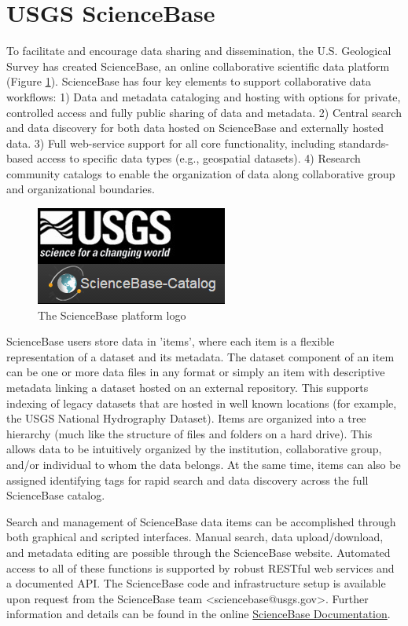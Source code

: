 \section{USGS ScienceBase}

To facilitate and encourage data sharing and dissemination,
the U.S. Geological Survey has created ScienceBase, an online
collaborative scientific data platform (Figure \ref{figure:sbfig}). 
ScienceBase has four key elements to support collaborative
data workflows: 1) Data and metadata
cataloging and hosting with options for private, controlled access
and fully public sharing of data and metadata. 2) Central search and
data discovery for both data hosted on ScienceBase and externally hosted 
data. 3) Full web-service support for all core functionality, including
standards-based access to specific data types (e.g., geospatial
datasets). 4) Research community catalogs to
enable the organization of data along collaborative group and
organizational boundaries.

 \begin{figure}[htbp]
   \centering
   \includegraphics{sblogo}
   \caption{The ScienceBase platform logo}
   \label{figure:sbfig}
 \end{figure}

ScienceBase users store data in 'items', where each item is a flexible
representation of a dataset and its metadata. The dataset component of an
item can be one or more data files in any format or simply an item with descriptive
metadata linking a dataset hosted on an external repository. This supports
indexing of legacy datasets that are hosted in well known locations (for example, 
the USGS National Hydrography Dataset). Items are organized into a tree hierarchy 
(much like the structure of files and
folders on a hard drive). This allows data to be intuitively organized by the
institution, collaborative group, and/or individual to whom
the data belongs. At the same time, items can also be assigned identifying tags
for rapid search and data discovery across the full ScienceBase catalog.

Search and management of ScienceBase data items can be accomplished through
both graphical and scripted interfaces. Manual search, data upload/download, and
metadata editing are possible through the ScienceBase website.
Automated access to all of these functions is supported by robust RESTful web
services and a documented API. The ScienceBase code and infrastructure setup 
is available upon request from the ScienceBase team <sciencebase@usgs.gov>. 
Further information and details can be found in the online 
\href{https://www.sciencebase.gov/about/using-sciencebase}{ScienceBase Documentation}.
